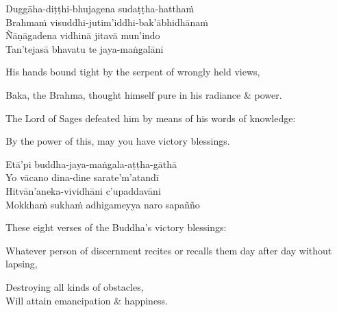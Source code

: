 \ifninebythirteen\clearpage\fi

\begin{pali-hang-continued}
  Duggāha-diṭṭhi-bhujagena sudaṭṭha-hatthaṁ\\
  Brahmaṁ visuddhi-jutim'iddhi-bak'ābhidhānaṁ\\
  Ñāṇāgadena vidhinā jitavā mun'indo\\
  Tan'tejasā bhavatu te jaya-maṅgalāni
\end{pali-hang-continued}

\begin{english-verses}
  \begin{english-hang-first-line}
  His hands bound tight by the serpent of wrongly held views,\\
  \end{english-hang-first-line}
  \begin{english-hang-together-verses}
  Baka, the Brahma, thought himself pure in his radiance \& power.\\
  \end{english-hang-together-verses}
  \begin{english-hang-together-verses}
  The Lord of Sages defeated him by means of his words of knowledge:\\
  \end{english-hang-together-verses}
  \begin{english-hang-together-verses}
  By the power of this, may you have victory blessings.
  \end{english-hang-together-verses}
\end{english-verses}

\begin{pali-hang-continued}
  Etā'pi buddha-jaya-maṅgala-aṭṭha-gāthā\\
  Yo vācano dina-dine sarate'm'atandī\\
  Hitvān'aneka-vividhāni c'upaddavāni\\
  Mokkhaṁ sukhaṁ adhigameyya naro sapañño
\end{pali-hang-continued}

\ifbfive\clearpage\fi

\begin{english-verses}
  These eight verses of the Buddha's victory blessings:
  \begin{english-hang-together-verses}
    Whatever person of discernment recites or recalls them day after day without lapsing,
  \end{english-hang-together-verses}
  Destroying all kinds of obstacles,\\
  Will attain emancipation \& happiness.
\end{english-verses}

